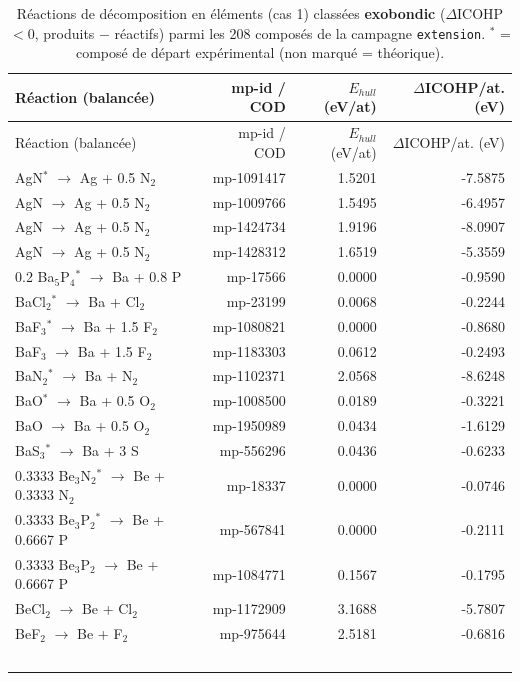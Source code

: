\begin{longtable}{@{}lrrr@{}}
\caption{Réactions de décomposition en éléments (cas 1) classées \textbf{exobondic} ($\Delta$ICOHP $< 0$, produits $-$ réactifs) parmi les 208 composés de la campagne \texttt{extension}. $^*$ = composé de départ expérimental (non marqué = théorique).}\\
\toprule
Réaction (balancée) & mp-id / COD & $E_{hull}$ (eV/at) & $\Delta$ICOHP/at. (eV) \\
\midrule
\endfirsthead
\toprule
Réaction (balancée) & mp-id / COD & $E_{hull}$ (eV/at) & $\Delta$ICOHP/at. (eV) \\
\midrule
\endhead
\bottomrule
\endfoot
AgN$^*$ $\rightarrow$ Ag + 0.5 N$_{2}$ & mp-1091417 & 1.5201 & -7.5875 \\
AgN $\rightarrow$ Ag + 0.5 N$_{2}$ & mp-1009766 & 1.5495 & -6.4957 \\
AgN $\rightarrow$ Ag + 0.5 N$_{2}$ & mp-1424734 & 1.9196 & -8.0907 \\
AgN $\rightarrow$ Ag + 0.5 N$_{2}$ & mp-1428312 & 1.6519 & -5.3559 \\
0.2 Ba$_{5}$P$_{4}$$^*$ $\rightarrow$ Ba + 0.8 P & mp-17566 & 0.0000 & -0.9590 \\
BaCl$_{2}$$^*$ $\rightarrow$ Ba + Cl$_{2}$ & mp-23199 & 0.0068 & -0.2244 \\
BaF$_{3}$$^*$ $\rightarrow$ Ba + 1.5 F$_{2}$ & mp-1080821 & 0.0000 & -0.8680 \\
BaF$_{3}$ $\rightarrow$ Ba + 1.5 F$_{2}$ & mp-1183303 & 0.0612 & -0.2493 \\
BaN$_{2}$$^*$ $\rightarrow$ Ba + N$_{2}$ & mp-1102371 & 2.0568 & -8.6248 \\
BaO$^*$ $\rightarrow$ Ba + 0.5 O$_{2}$ & mp-1008500 & 0.0189 & -0.3221 \\
BaO $\rightarrow$ Ba + 0.5 O$_{2}$ & mp-1950989 & 0.0434 & -1.6129 \\
BaS$_{3}$$^*$ $\rightarrow$ Ba + 3 S & mp-556296 & 0.0436 & -0.6233 \\
0.3333 Be$_{3}$N$_{2}$$^*$ $\rightarrow$ Be + 0.3333 N$_{2}$ & mp-18337 & 0.0000 & -0.0746 \\
0.3333 Be$_{3}$P$_{2}$$^*$ $\rightarrow$ Be + 0.6667 P & mp-567841 & 0.0000 & -0.2111 \\
0.3333 Be$_{3}$P$_{2}$ $\rightarrow$ Be + 0.6667 P & mp-1084771 & 0.1567 & -0.1795 \\
BeCl$_{2}$ $\rightarrow$ Be + Cl$_{2}$ & mp-1172909 & 3.1688 & -5.7807 \\
BeF$_{2}$ $\rightarrow$ Be + F$_{2}$ & mp-975644 & 2.5181 & -0.6816 \\
$$
\end{longtable}
